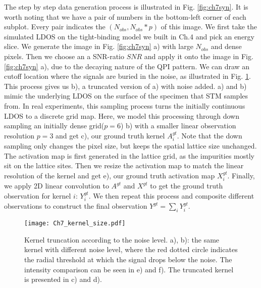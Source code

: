 The step by step data generation process is illustrated in Fig. \ref{fig:ch7syn}. It is worth noting that we have a pair of numbers in the bottom-left corner of each subplot. Every pair indicates the $(N_{obs}, N_{obs}*p)$ of this image. We first take the simulated \ac{LDOS} on the tight-binding model we built in Ch.4 and pick an energy slice. We generate the image in Fig. \ref{fig:ch7syn} a) with large $N_{obs}$ and dense pixels. Then we choose an a SNR-ratio $SNR$ and apply it onto the image in Fig. \ref{fig:ch7syn} a), due to the decaying nature of the \ac{QPI} pattern. We can draw an cutoff location where the signals are buried in the noise, as illustrated in Fig. \ref{fig:ch7_kernel_size}. This process gives us b), a truncated version of a) with noise added. a) and b) mimic the underlying \ac{LDOS} on the surface of the specimen that \ac{STM} samples from. In real experiments, this sampling process turns the initially continuous \ac{LDOS} to a discrete grid map. Here, we model this processing through down sampling an initially dense grid($p=6$) b) with a smaller linear observation resolution $p=3$ and get c), our ground truth kernel $A^{gt}_i$. Note that the down sampling only changes the pixel size, but keeps the spatial lattice size unchanged. The activation map is first generated in the lattice grid, as the impurities mostly sit on the lattice sites. Then we resize the activation map to match the linear resolution of the kernel and get e), our ground truth activation map $X^{gt}_i$. Finally, we apply 2D linear convolution to $A^{gt}$ and $X^{gt}$ to get the ground truth observation for kernel $i$: $Y^{gt}_i$. We then repeat this process and composite different observations to construct the final observation $Y^{gt}= \sum_iY^{gt}_i$. 

\begin{figure}
	\texttt{[image: Ch7\_kernel\_size.pdf]} 
	\centering
	\caption{Kernel truncation according to the noise level. a), b): the same kernel with different noise level, where the red dotted circle indicates the radial threshold at which the signal drops below the noise. The intensity comparison can be seen in e) and f). The truncated kernel is presented in c) and d).}
	\label{fig:ch7_kernel_size}
\end{figure}

